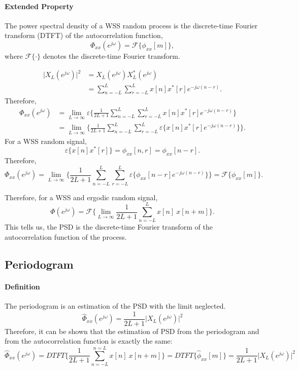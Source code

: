 \paragraph{Extended Property} The power spectral density of a WSS random process is the discrete-time Fourier transform (DTFT) of the autocorrelation function,
\[
    \Phi_{xx}(e^{j\omega}) = \mathcal{F} \{\phi_{xx}[m]\},
\]
where $\mathcal{F}\{\cdot\}$ denotes the discrete-time Fourier transform.
\begin{dv}{}
\begin{align*}
    \lvert X_{L}(e^{j\omega})\rvert^2 
    & = X_L(e^{j\omega}) X_L^{*}(e^{j\omega}) \\
    & = \sum_{n=-L}^{L} \sum_{r=-L}^{L} x[n] x^{*}[r] e^{-j\omega (n-r)}.
\end{align*}    
Therefore,
\begin{align*}
    \Phi_{xx}(e^{j\omega}) 
    & = \lim_{L\to\infty} \varepsilon \bigg\{ \frac{1}{2L+1} \sum_{n=-L}^{L} \sum_{r=-L}^{L} x[n] x^{*}[r] e^{-j\omega (n-r)} \bigg\} \\
    & = \lim_{L\to \infty} \bigg\{ \frac{1}{2L+1} \sum_{n=-L}^{L} \sum_{r=-L}^{L} \varepsilon \{ x[n] x^{*}[r] e^{-j\omega (n-r)} \} \bigg \}.
\end{align*}
For a WSS random signal,
\[
    \varepsilon \{ x[n] x^{*}[r] \} = \phi_{xx}[n, r] = \phi_{xx}[n-r].
\]
Therefore,
\[
    \Phi_{xx}(e^{j\omega}) = \lim_{L\to \infty} \bigg\{ \frac{1}{2L+1} \sum_{n=-L}^{L} \sum_{r=-L}^{L} \varepsilon \{ \phi_{xx}[n-r] e^{-j\omega (n-r)} \} \bigg \} = \mathcal{F}\{\phi_{xx}[m]\}.
\]
\end{dv}

Therefore, for a WSS and ergodic random signal,
\[
    \Phi(e^{j\omega}) = \mathcal{F} \bigg\{ \lim_{L\to\infty} \frac{1}{2L+1} \sum_{n=-L}^{L} x[n] \ x[n+m] \bigg\}.
\]
This tells us, the PSD is the discrete-time Fourier transform of the autocorrelation function of the process.

\subsection{Periodogram}
\paragraph{Definition} The periodogram is an estimation of the PSD with the limit neglected. 
\[
    \widehat{\Phi}_{xx} (e^{j\omega}) = \frac{1}{2L+1} \lvert X_{L} (e^{j\omega}) \rvert^2
\]
Therefore, it can be shown that the estimation of PSD from the periodogram and from the autocorrelation function is exactly the same:
\[
    \widehat{\Phi}_{xx}(e^{j\omega}) = DTFT \bigg\{ \frac{1}{2L+1} \sum_{n=-L}^{n=L} x[n] \ x[n+m] \bigg\} = DTFT \{ \widehat{\phi}_{xx}[m] \} = \frac{1}{2L+1} \lvert X_{L}(e^{j\omega})\rvert^2
\]
